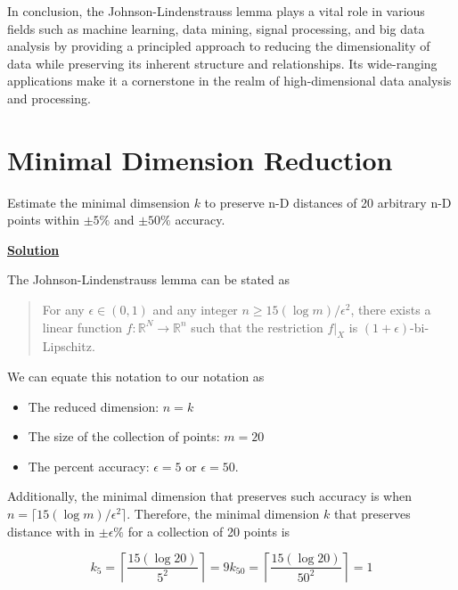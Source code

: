 \documentclass{article}
\renewcommand{\_}{\ifincsname_\else\legacyunderscore\fi}
\begin{document}
In conclusion, the Johnson-Lindenstrauss lemma plays a vital role in various fields such as machine learning, data mining, signal processing, and big data analysis by providing a principled approach to reducing the dimensionality of data while preserving its inherent structure and relationships. Its wide-ranging applications make it a cornerstone in the realm of high-dimensional data analysis and processing.


\section*{Minimal Dimension Reduction}

    Estimate the minimal dimsension $k$ to preserve n-D distances of 20 arbitrary n-D points within $\pm5\%$ and $\pm50\%$ accuracy.

    \underline{\textbf{Solution}}

    The Johnson-Lindenstrauss lemma can be stated as 

    \begin{quote}
        For any $\epsilon \in (0,1)$ and any integer $n \geq 15(\log m) / \epsilon^2$, there exists a linear function $f: \mathbb{R}^N \to \mathbb{R}^n$ such that the restriction $f|_X$ is $(1 + \epsilon)$-bi-Lipschitz.
    \end{quote}

    We can equate this notation to our notation as

    \begin{itemize}
        \item The reduced dimension: $n = k$
        \item The size of the collection of points: $m = 20$
        \item The percent accuracy: $\epsilon = 5$ or $\epsilon = 50$.
    \end{itemize}

    Additionally, the minimal dimension that preserves such accuracy is when $n = \lceil 15(\log m) / \epsilon^2 \rceil$. Therefore, the minimal dimension $k$ that preserves distance with in $\pm\epsilon\%$ for a collection of 20 points is 

    \begin{subequations}
        \begin{equation*}
            k_5 = \left\lceil \frac{15 (\log 20)}{5^2} \right\rceil = 9
        \end{equation*}
        \begin{equation*}
            k_{50} = \left\lceil \frac{15 (\log 20)}{50^2} \right\rceil = 1
        \end{equation*}    
    \end{subequations}
    
\end{document}
